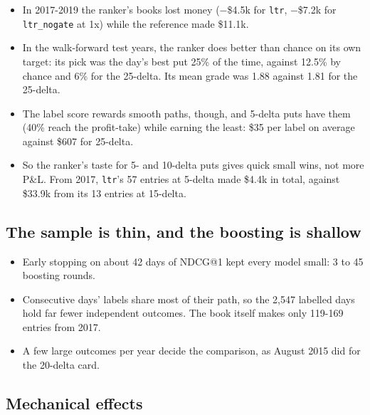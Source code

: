 \documentclass{article}
\begin{document}
\begin{itemize}

\item In 2017-2019 the ranker's books lost money (\ensuremath{-}\$4.5k for \texttt{ltr}, \ensuremath{-}\$7.2k for \texttt{ltr\_\allowbreak{}nogate} at 1x) while the reference made \$11.1k.

\item In the walk-forward test years, the ranker does better than chance on its own target: its pick was the day's best put 25\% of the time, against 12.5\% by chance and 6\% for the 25-delta. Its mean grade was 1.88 against 1.81 for the 25-delta.

\item The label score rewards smooth paths, though, and 5-delta puts have them (40\% reach the profit-take) while earning the least: \$35 per label on average against \$607 for 25-delta.

\item So the ranker's taste for 5- and 10-delta puts gives quick small wins, not more P\&L. From 2017, \texttt{ltr}'s 57 entries at 5-delta made \$4.4k in total, against \$33.9k from its 13 entries at 15-delta.

\end{itemize}

\subsection{The sample is thin, and the boosting is shallow}

\begin{itemize}

\item Early stopping on about 42 days of NDCG@1 kept every model small: 3 to 45 boosting rounds.

\item Consecutive days' labels share most of their path, so the 2,547 labelled days hold far fewer independent outcomes. The book itself makes only 119-169 entries from 2017.

\item A few large outcomes per year decide the comparison, as August 2015 did for the 20-delta card.

\end{itemize}

\subsection{Mechanical effects}
\end{document}
